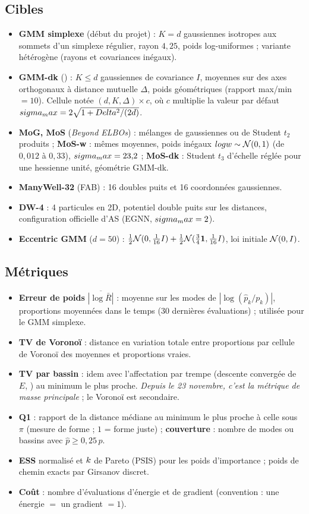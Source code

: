 \subsection{Cibles}
\begin{itemize}
  \item \textbf{GMM simplexe} (début du projet) : $K=d$ gaussiennes isotropes aux sommets d'un simplexe régulier, rayon $4{,}25$, poids log-uniformes ; variante hétérogène (rayons et covariances inégaux).
  \item \textbf{GMM-dk} () : $K\le d$ gaussiennes de covariance $I$, moyennes sur des axes orthogonaux à distance mutuelle $\Delta$, poids géométriques (rapport max/min $=10$). Cellule notée $(d,K,\Delta)\times c$, où $c$ multiplie la valeur par défaut $sigma_max=2\sqrt{1+Delta^2/(2d)}$.
  \item \textbf{MoG, MoS} (\emph{Beyond ELBOs}) : mélanges de gaussiennes ou de Student $t_2$ produits ; \textbf{MoS-w} : mêmes moyennes, poids inégaux $log w\sim\mathcal{N}(0,1)$ (de $0{,}012$ à $0{,}33$), $sigma_max=23{,}2$ ; \textbf{MoS-dk} : Student $t_3$ d'échelle réglée pour une hessienne unité, géométrie GMM-dk.
  \item \textbf{ManyWell-32} (FAB) : 16 doubles puits et 16 coordonnées gaussiennes.
  \item \textbf{DW-4} : 4 particules en 2D, potentiel double puits sur les distances, configuration officielle d'AS (EGNN, $sigma_max=2$).
  \item \textbf{Eccentric GMM} ($d=50$) : $\tfrac12\mathcal{N}(0,\tfrac1{16}I)+\tfrac12\mathcal{N}(\tfrac34\mathbf 1,\tfrac1{16}I)$, loi initiale $\mathcal{N}(0,I)$.
\end{itemize}

\subsection{Métriques}
\begin{itemize}
  \item \textbf{Erreur de poids} $\overline{|\log \bar R|}$ : moyenne sur les modes de $|\log(\hat p_k/p_k)|$, proportions moyennées dans le temps (30 dernières évaluations) ; utilisée pour le GMM simplexe.
  \item \textbf{TV de Voronoï} : distance en variation totale entre proportions par cellule de Voronoï des moyennes et proportions vraies.
  \item \textbf{TV par bassin} : idem avec l'affectation par trempe (descente convergée de $E$, ) au minimum le plus proche. \emph{Depuis le 23 novembre, c'est la métrique de masse principale} ; le Voronoï est secondaire.
  \item \textbf{Q1} : rapport de la distance médiane au minimum le plus proche à celle sous $\pi$ (mesure de forme ; $1$ = forme juste) ; \textbf{couverture} : nombre de modes ou bassins avec $\hat p\ge 0{,}25\,p$.
  \item \textbf{ESS} normalisé et $k$ de Pareto (PSIS) pour les poids d'importance ; poids de chemin exacts par Girsanov discret.
  \item \textbf{Coût} : nombre d'évaluations d'énergie et de gradient (convention : une énergie $=$ un gradient $=1$).
\end{itemize}

